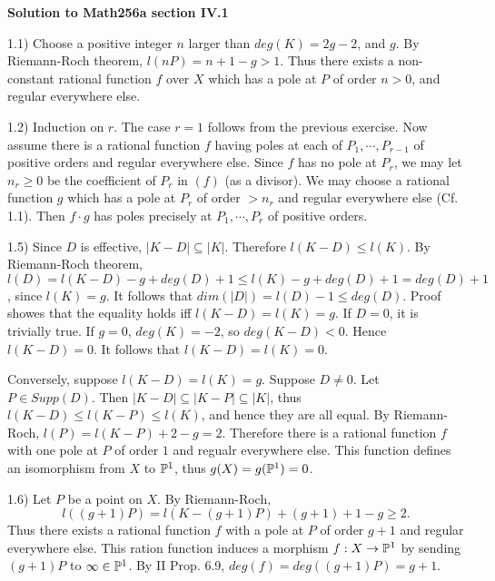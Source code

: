 



{\bf Solution to Math256a section IV.1}

1.1) Choose a positive integer $n$ larger than $deg(K)=2g-2$, and
$g$. By Riemann-Roch theorem, $l(nP)=n+1-g>1$. Thus there exists a
non-constant rational function $f$ over $X$ which has a pole at $P$ of
order $n>0$, and regular everywhere else. 

1.2) Induction on $r$. The case $r=1$ follows from the previous
exercise. Now assume there is a rational function $f$ having poles at
each of $P_1,\cdots, P_{r-1}$ of positive orders and regular
everywhere else. Since $f$ has no pole at $P_r$, we may let $n_r\geq
0$ be the coefficient of $P_r$ in $(f)$ (as a divisor). We may choose
a rational function $g$ which has a pole at $P_r$ of order $>n_r$ and
regular everywhere else (Cf. 1.1). Then $f\cdot g$ has poles precisely
at $P_1,
\cdots, P_r$ of positive orders.

1.5) Since $D$ is effective, $|K-D|\subseteq |K|$. Therefore
$l(K-D)\leq l(K)$. By Riemann-Roch theorem,
$l(D)=l(K-D)-g+deg(D)+1\leq l(K)-g+deg(D)+1=deg(D)+1$, since
$l(K)=g$. It follows that $dim(|D|)=l(D)-1\leq deg(D)$.
Proof showes that the equality holds iff $l(K-D)=l(K)=g$. 
If $D=0$, it is trivially true. If $g=0$, $deg(K)=-2$, so
$deg(K-D)<0$. Hence $l(K-D)=0$. It follows that $l(K-D)=l(K)=0$.

Conversely, suppose $l(K-D)=l(K)=g$. Suppose $D\not =0$. Let $P\in
Supp(D)$. Then $|K-D|\subseteq |K-P| \subseteq |K|$, thus $l(K-D)\leq
l(K-P) \leq l(K)$, and hence they are all equal. By Riemann-Roch,
$l(P)=l(K-P)+2-g=2$. Therefore there is a rational function $f$ with
one pole at $P$ of order $1$ and regualr everywhere else. This
function defines an isomorphism from $X$ to ${\Bbb P}^1$, thus
$g(X)=g({\Bbb P}^1)=0$.

1.6) Let $P$ be a point on $X$. By Riemann-Roch,
$$l((g+1)P)=l(K-(g+1)P)+(g+1)+1-g\geq 2.$$ Thus there exists a
rational function $f$ with a pole at $P$ of order $g+1$ and regular
everywhere else. This ration function induces a morphism $f:
X\rightarrow {\Bbb P}^1$ by sending $(g+1)P$ to ${\infty}\in {\Bbb
P}^1$. By II Prop. 6.9, $deg(f)=deg((g+1)P)=g+1$.

